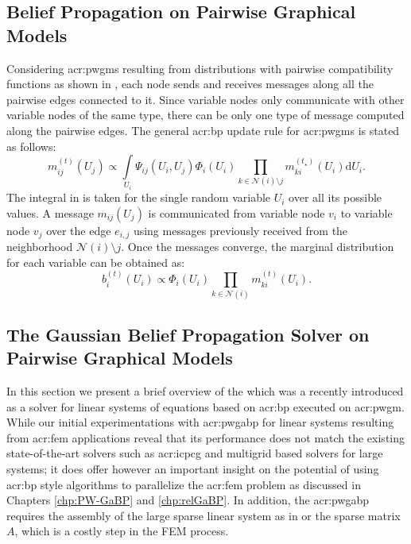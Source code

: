 \subsection{Belief Propagation on Pairwise Graphical Models}
\label{sec:pwgabp}


Considering \glspl{acr:pwgm} resulting from distributions with pairwise compatibility functions as shown in , each node sends and receives messages along all the pairwise edges connected to it.
Since variable nodes only communicate with other variable nodes of the same type, there can be only one type of message computed along the pairwise edges.
The general \gls{acr:bp} update rule for \glspl{acr:pwgm} is stated as follows:
\begin{equation}
	m_{ij}^{(t)}(U_j) \propto \underset{U_i}{\int}\Psi_{ij}(U_i,U_j)\Phi_i(U_i)\prod_{k\in\mathcal{N}(i)\setminus j}m_{ki}^{(t_\star)}(U_i)\mathrm{d} U_i. \label{eqn:genBPpw}
\end{equation}
The integral in  is taken for the single random variable $U_i$ over all its possible values.
A message $m_{ij}(U_j)$ is communicated from variable node $v_i$ to variable node $v_j$ over the edge $e_{i,j}$ using messages previously received from the neighborhood $\mathcal{N}(i)\setminus j$.
Once the messages converge, the marginal distribution for each variable can be obtained as:
\begin{equation}
	b_{i}^{(t)}(U_i) \propto \Phi_i(U_i) \prod_{k\in\mathcal{N}(i)}m_{ki}^{(t)}(U_i). \label{eqn:genBBPpw}
\end{equation}


\subsection{The Gaussian Belief Propagation Solver on Pairwise Graphical Models}


In this section we present a brief overview of the  \cite{bib:Shental2008GBPSSLE,bib:Weiss01CorrectnessBelief} which was a recently introduced as a solver for linear systems of equations based on \gls{acr:bp} executed on \gls{acr:pwgm}.
While our initial experimentations with \gls{acr:pwgabp} for linear systems resulting from \gls{acr:fem} applications reveal that its performance does not match the existing state-of-the-art solvers such as \gls{acr:icpcg} and multigrid based solvers for large systems; it does offer however an important insight on the potential of using \gls{acr:bp} style algorithms to parallelize the \gls{acr:fem} problem as discussed in Chapters \ref{chp:PW-GaBP} and \ref{chp:relGaBP}.
In addition, the \gls{acr:pwgabp} requires the assembly of the large sparse linear system as in  or the sparse matrix $A$, which is a costly step in the FEM process.


